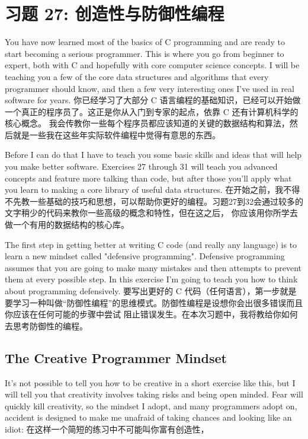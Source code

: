 \chapter{习题 27: 创造性与防御性编程}

You have now learned most of the basics of C programming and are ready to start becoming a serious
programmer.  This is where you go from beginner to expert, both with C and hopefully with
core computer science concepts.  I will be teaching you a few of the core data structures and
algorithms that every programmer should know, and then a few very interesting ones I've used
in real software for years.
你已经学习了大部分 C 语言编程的基础知识，已经可以开始做一个真正的程序员了。这正是你从入门到专家的起点，依靠 C 还有计算机科学的核心概念。
我会传教你一些每个程序员都应该知道的关键的数据结构和算法，然后就是一些我在这些年实际软件编程中觉得有意思的东西。

Before I can do that I have to teach you some basic skills and ideas that will help you
make better software.  Exercises 27 through 31 will teach you advanced concepts and feature
more talking than code, but after those you'll apply what you learn to making a core library
of useful data structures.
在开始之前，我不得不先教一些基础的技巧和思想，可以帮助你更好的编程。习题27到32会通过较多的文字稍少的代码来教你一些高级的概念和特性，但在这之后，
你应该用你所学去做一个有用的数据结构的核心库。

The first step in getting better at writing C code (and really any language) is
to learn a new mindset called "defensive programming".  Defensive programming
assumes that you are going to make many mistakes and then attempts to prevent
them at every possible step.   In this exercise I'm going to teach you how 
to think about programming defensively.
要写出更好的 C 代码（任何语言），第一步就是要学习一种叫做“防御性编程”的思维模式。防御性编程是设想你会出很多错误而且你应该在任何可能的步骤中尝试
阻止错误发生。在本次习题中，我将教给你如何去思考防御性的编程。

\section{The Creative Programmer Mindset}

It's not possible to tell you how to be creative in a short exercise like this,
but I will tell you that creativity involves taking risks and being open minded.
Fear will quickly kill creativity, so the mindset I adopt, and many programmers
adopt on, accident is designed to make me unafraid of taking chances and 
looking like an idiot:
在这样一个简短的练习中不可能叫你富有创造性，

